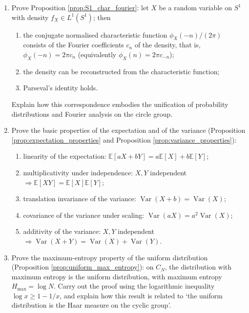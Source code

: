 \begin{enumerate}[leftmargin=3em, label=\textbf{Exercise \arabic*}]
    \item Prove Proposition \ref{prop:S1_char_fourier}:
    let $X$ be a random variable on $S^1$ with density $f_X\in L^1(S^1)$; then
    \begin{enumerate}[label=(\roman*)]
        \item the conjugate normalised characteristic function $\phi_X(-n)/(2\pi)$ consists of the Fourier coefficients $c_n$ of the density, that is, $\phi_X(-n)=2\pi c_n$ (equivalently $\phi_X(n)=2\pi c_{-n}$);
        \item the density can be reconstructed from the characteristic function;
        \item Parseval's identity holds.
    \end{enumerate}
    Explain how this correspondence embodies the unification of probability distributions and Fourier analysis on the circle group.

    \item Prove the basic properties of the expectation and of the variance (Proposition \ref{prop:expectation_properties}
    and Proposition \ref{prop:variance_properties}):
    \begin{enumerate}[label=(\roman*)]
        \item linearity of the expectation: $\mathbb{E}[aX+bY]=a\mathbb{E}[X]+b\mathbb{E}[Y]$;
        \item multiplicativity under independence: $X,Y$ independent $\Rightarrow\mathbb{E}[XY]=\mathbb{E}[X]\mathbb{E}[Y]$;
        \item translation invariance of the variance: $\operatorname{Var}(X+b)=\operatorname{Var}(X)$;
        \item covariance of the variance under scaling: $\operatorname{Var}(aX)=a^2\operatorname{Var}(X)$;
        \item additivity of the variance: $X,Y$ independent $\Rightarrow\operatorname{Var}(X+Y)=\operatorname{Var}(X)+\operatorname{Var}(Y)$.
    \end{enumerate}

    \item Prove the maximum-entropy property of the uniform distribution (Proposition \ref{prop:uniform_max_entropy}):
    on $C_N$, the distribution with maximum entropy is the uniform distribution, with maximum entropy $H_{\max}=\log N$.
    Carry out the proof using the logarithmic inequality $\log x\ge1-1/x$,
    and explain how this result is related to `the uniform distribution is the Haar measure on the cyclic group'.


\end{enumerate}
